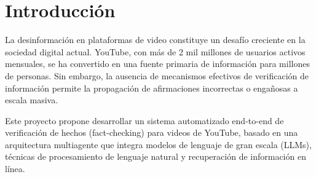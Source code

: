 \documentclass[12pt,a4paper,twoside]{book}
\begin{document}
\setcounter{section}{0}
\renewcommand{\thesection}{\arabic{section}}




\newpage

\pagestyle{fancy}
\renewcommand{\chaptermark}[1]{ \markboth{#1}{}}
\renewcommand{\sectionmark}[1]{\markright{ \thesection.\ #1}}
\lhead[\fancyplain{}{\bfseries\thepage}]{\fancyplain{}{\bfseries\rightmark}}
\rhead[\fancyplain{}{\bfseries\leftmark}]{\fancyplain{}{\bfseries\thepage}}
\cfoot{}

\cleardoublepage
{}
{}
\tableofcontents
\cleardoublepage
{}
{}
\listoffigures
\cleardoublepage
{}
{}
\listoftables

\thispagestyle{empty}


\pagestyle{fancy}
\renewcommand{\chaptermark}[1]{ \markboth{#1}{}}
\renewcommand{\sectionmark}[1]{\markright{ \thesection.\ #1}}
\lhead[\fancyplain{}{\bfseries\thepage}]{\fancyplain{}{\bfseries\rightmark}}
\rhead[\fancyplain{}{\bfseries\leftmark}]{\fancyplain{}{\bfseries\thepage}}
\cfoot{}

\onehalfspacing

\section{Introducción}

La desinformación en plataformas de video constituye un desafío creciente en la sociedad digital actual. YouTube, con más de 2 mil millones de usuarios activos mensuales, se ha convertido en una fuente primaria de información para millones de personas. Sin embargo, la ausencia de mecanismos efectivos de verificación de información permite la propagación de afirmaciones incorrectas o engañosas a escala masiva.

Este proyecto propone desarrollar un sistema automatizado end-to-end de verificación de hechos (fact-checking) para videos de YouTube, basado en una arquitectura multiagente que integra modelos de lenguaje de gran escala (LLMs), técnicas de procesamiento de lenguaje natural y recuperación de información en línea.
\end{document}
